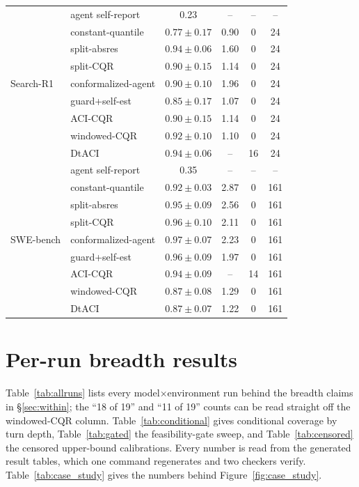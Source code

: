 \documentclass{article}
\begin{document}
\begin{table}[t]
\begin{tabular}{@{}llcccc@{}}
\midrule
\multirow{9}{*}{Search-R1}
 & agent self-report & 0.23 & -- & -- & -- \\
 & constant-quantile & $0.77\pm0.17$ & 0.90 & 0 & 24 \\
 & split-absres & $0.94\pm0.06$ & 1.60 & 0 & 24 \\
 & split-CQR & $0.90\pm0.15$ & 1.14 & 0 & 24 \\
 & conformalized-agent & $0.90\pm0.10$ & 1.96 & 0 & 24 \\
 & guard+self-est & $0.85\pm0.17$ & 1.07 & 0 & 24 \\
 & ACI-CQR & $0.90\pm0.15$ & 1.14 & 0 & 24 \\
 & windowed-CQR & $0.92\pm0.10$ & 1.10 & 0 & 24 \\
 & DtACI & $0.94\pm0.06$ & -- & 16 & 24 \\
\midrule
\multirow{9}{*}{SWE-bench}
 & agent self-report & 0.35 & -- & -- & -- \\
 & constant-quantile & $0.92\pm0.03$ & 2.87 & 0 & 161 \\
 & split-absres & $0.95\pm0.09$ & 2.56 & 0 & 161 \\
 & split-CQR & $0.96\pm0.10$ & 2.11 & 0 & 161 \\
 & conformalized-agent & $0.97\pm0.07$ & 2.23 & 0 & 161 \\
 & guard+self-est & $0.96\pm0.09$ & 1.97 & 0 & 161 \\
 & ACI-CQR & $0.94\pm0.09$ & -- & 14 & 161 \\
 & windowed-CQR & $0.87\pm0.08$ & 1.29 & 0 & 161 \\
 & DtACI & $0.87\pm0.07$ & 1.22 & 0 & 161 \\
\bottomrule
\end{tabular}
\end{table}

\section{Per-run breadth results}
\label{app:breadth}

Table~\ref{tab:allruns} lists every model$\times$environment run behind the breadth claims in \S\ref{sec:within}; the ``18 of 19'' and ``11 of 19'' counts can be read straight off the windowed-CQR column. Table~\ref{tab:conditional} gives conditional coverage by turn depth, Table~\ref{tab:gated} the feasibility-gate sweep, and Table~\ref{tab:censored} the censored upper-bound calibrations. Every number is read from the generated result tables, which one command regenerates and two checkers verify. Table~\ref{tab:case_study} gives the numbers behind Figure~\ref{fig:case_study}.
\end{document}
